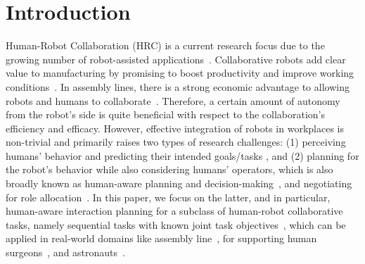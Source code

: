 \documentclass[letterpaper]{article} %
\begin{document}
\section{Introduction}
Human-Robot Collaboration (HRC) is a current research focus due to the growing number of robot-assisted applications~\cite{kragic2021effective,selvaggio2021autonomy}. Collaborative robots add clear value to manufacturing by promising to boost productivity and improve working conditions~\cite{johannsmeier2016hierarchical}. In assembly lines, there is a strong economic advantage to allowing robots and humans to collaborate~\cite{nikolaidis2012human,coupete2015gesture}. Therefore, a certain amount of autonomy from the robot's side is quite beneficial with respect to the collaboration's efficiency and efficacy.  
However, effective integration of robots in workplaces is non-trivial and primarily raises two types of research challenges: (1) perceiving humans' behavior and predicting their intended goals/tasks \cite{cheng2020towards,cheng2019human}, and (2) planning for the robot's behavior while also considering humans' operators, which is also broadly known as human-aware planning and decision-making~\cite{CirilloKS09,alami2006toward,de2015hatp,CramerKD21,UnhelkarLS20}, and negotiating for role allocation~\cite{roncone2017transparent}. 
In this paper, we focus on the latter, and in particular, human-aware interaction planning for a subclass of human-robot collaborative tasks, namely sequential tasks with known joint task objectives~\cite{cheng2021human,UnhelkarLS19,buisan:hal-03684211}, which can be applied in real-world domains like assembly line~\cite{unhelkar2018human}, for supporting human surgeons~\cite{jacob2013collaboration}, and astronauts~\cite{diftler2011robonaut}. 
\end{document}
